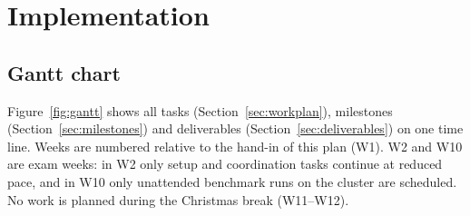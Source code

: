 \section{Implementation}


\newcommand{\task}[6]{%
  \par\noindent\textbf{#1 #2}, lead: \textbf{#3}, participants: #4 (#5).\enspace #6\par\smallskip}
\newcommand{\taskgroup}[3]{%
  \par\medskip\noindent\colorbox{black!8}{\parbox{\dimexpr\linewidth-2\fboxsep}{\textbf{#1}\hfill lead: #2 \quad #3}}\par\smallskip}

\subsection{Gantt chart}

Figure~\ref{fig:gantt} shows all tasks (Section~\ref{sec:workplan}), milestones (Section~\ref{sec:milestones}) and deliverables (Section~\ref{sec:deliverables}) on one time line. Weeks are numbered relative to the hand-in of this plan (W1). W2 and W10 are exam weeks: in W2 only setup and coordination tasks continue at reduced pace, and in W10 only unattended benchmark runs on the cluster are scheduled. No work is planned during the Christmas break (W11--W12).

